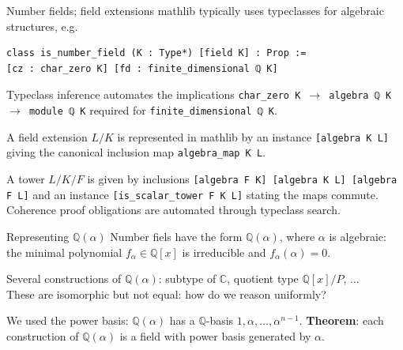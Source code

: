 \documentclass{beamer}
\newcommand{\C}{\mathbb{C}}
\newcommand{\lean}[1]{\texttt{#1}\xspace}
\newcommand{\mathlib}{\textsf{mathlib}\xspace}
\newcommand{\Q}{\mathbb{Q}}
\newcommand{\Z}{\mathbb{Z}}
\DeclareMathOperator{\Frac}{Frac}
\begin{document}
\begin{frame}[fragile]{Number fields; field extensions}
	\mathlib typically uses typeclasses for algebraic structures, e.g.

\begin{lstlisting}
class is_number_field (K : Type*) [field K] : Prop :=
[cz : char_zero K] [fd : finite_dimensional ℚ K]
\end{lstlisting}

	Typeclass inference automates the implications \lean{char\_zero K $\to$ algebra ℚ K $\to$ module ℚ K}
	required for \lean{finite\_dimensional ℚ K}.

\pause

	A \alert{field extension} $L / K$ is represented in \mathlib by an instance \lean{[algebra K L]}
	giving the canonical inclusion map \lean{algebra\_map K L}.

\pause
	A tower $L / K / F$ is given by inclusions \lean{[algebra F K] [algebra K L] [algebra F L]}
	and an instance \lean{[is\_scalar\_tower F K L]} stating the maps commute.\\
	Coherence proof obligations are automated through typeclass search.
\end{frame}

%
%

\begin{frame}{Representing $\Q(\alpha)$}
	Number fiels have the form $\Q(\alpha)$, where $\alpha$ is algebraic:\\
	the minimal polynomial $f_\alpha \in \Q[x]$ is irreducible and $f_\alpha(\alpha) = 0$.

	Several constructions of $\Q(\alpha)$: subtype of $\C$, quotient type $\Q[x] / P$, ...\\
	These are isomorphic but not equal: how do we reason uniformly?

\pause
	We used the \alert{power basis}: $\Q(\alpha)$ has a $\Q$-basis $1, \alpha, \dots, \alpha^{n - 1}$.
	\textbf{Theorem}: each construction of $\Q(\alpha)$ is a field with power basis generated by $\alpha$.
\end{frame}
\end{document}
